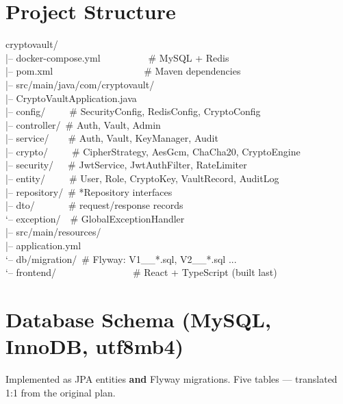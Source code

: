 \documentclass[11pt,a4paper]{article}
\begin{document}
\section{Project Structure}
\begin{tcolorbox}[colback=boxbg,colframe=gray!50]
\ttfamily\small
cryptovault/\\
\hphantom{x}|-- docker-compose.yml\ \ \ \ \ \ \ \ \ \ \# MySQL + Redis\\
\hphantom{x}|-- pom.xml\ \ \ \ \ \ \ \ \ \ \ \ \ \ \ \ \ \ \ \# Maven dependencies\\
\hphantom{x}|-- src/main/java/com/cryptovault/\\
\hphantom{xxxx}|-- CryptoVaultApplication.java\\
\hphantom{xxxx}|-- config/\ \ \ \ \ \# SecurityConfig, RedisConfig, CryptoConfig\\
\hphantom{xxxx}|-- controller/\ \# Auth, Vault, Admin\\
\hphantom{xxxx}|-- service/\ \ \ \ \# Auth, Vault, KeyManager, Audit\\
\hphantom{xxxx}|-- crypto/\ \ \ \ \ \# CipherStrategy, AesGcm, ChaCha20, CryptoEngine\\
\hphantom{xxxx}|-- security/\ \ \ \# JwtService, JwtAuthFilter, RateLimiter\\
\hphantom{xxxx}|-- entity/\ \ \ \ \ \# User, Role, CryptoKey, VaultRecord, AuditLog\\
\hphantom{xxxx}|-- repository/\ \# *Repository interfaces\\
\hphantom{xxxx}|-- dto/\ \ \ \ \ \ \ \# request/response records\\
\hphantom{xxxx}`-- exception/\ \ \# GlobalExceptionHandler\\
\hphantom{x}|-- src/main/resources/\\
\hphantom{xxxx}|-- application.yml\\
\hphantom{xxxx}`-- db/migration/\ \# Flyway: V1\_\_*.sql, V2\_\_*.sql ...\\
\hphantom{x}`-- frontend/\ \ \ \ \ \ \ \ \ \ \ \ \ \ \ \ \# React + TypeScript (built last)
\end{tcolorbox}

\section{Database Schema (MySQL, InnoDB, utf8mb4)}
Implemented as JPA entities \textbf{and} Flyway migrations. Five tables — translated 1:1 from the
original plan.
\end{document}
